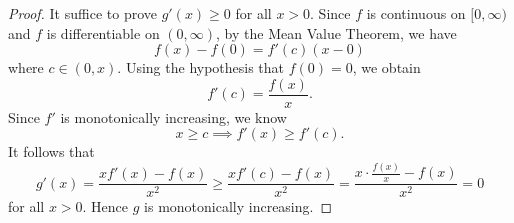 \begin{Exercise}
	\begin{proof}
		It suffice to prove $g'(x) \geq 0$ for all $x>0$.
		Since $f$ is continuous on $[0,\infty)$ and $f$ is differentiable on $(0,\infty)$, by the Mean Value Theorem, we have
		$$
		f(x) - f(0) = f'(c)(x-0)
		$$
		where $c\in(0,x)$.
		Using the hypothesis that $f(0) = 0$, we obtain
		$$
		f'(c) = \frac{f(x)}{x}.
		$$
		Since $f'$ is monotonically increasing, we know
		$$
		x\geq c \implies f'(x) \geq f'(c).
		$$
		It follows that
		$$
		g'(x) 
		= \frac{xf'(x) - f(x)}{x^2} 
		\geq \frac{xf'(c) - f(x)}{x^2}
		= \frac{x \cdot \frac{f(x)}{x} - f(x)}{x^2}
		= 0
		$$
		for all $x>0$.
		Hence $g$ is monotonically increasing.
	\end{proof}
\end{Exercise}